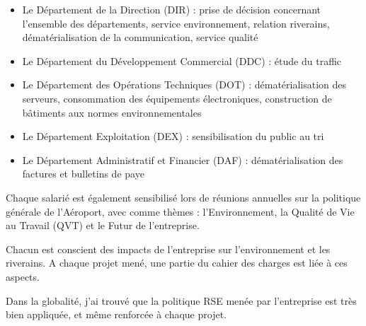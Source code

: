 \begin{itemize}
    \item Le Département de la Direction (DIR) : prise de décision concernant l'ensemble des départements, service environnement, relation riverains, dématérialisation de la communication, service qualité
    \item Le Département du Développement Commercial (DDC) : étude du traffic
    \item Le Département des Opérations Techniques (DOT) : dématérialisation des serveurs, consommation des équipements électroniques, construction de bâtiments aux normes environnementales
    \item Le Département Exploitation (DEX) : sensibilisation du public au tri
    \item Le Département Administratif et Financier (DAF) : dématérialisation des factures et bulletins de paye\newline
\end{itemize}

Chaque salarié est également sensibilisé lors de réunions annuelles sur la politique générale de l'Aéroport, avec comme thèmes : l'Environnement, la Qualité de Vie au Travail (QVT) et le Futur de l'entreprise.

Chacun est conscient des impacts de l'entreprise sur l'environnement et les riverains. A chaque projet mené, une partie du cahier des charges est liée à ces aspects.

Dans la globalité, j’ai trouvé que la politique RSE menée par l’entreprise est très bien appliquée, et même renforcée à chaque projet.
